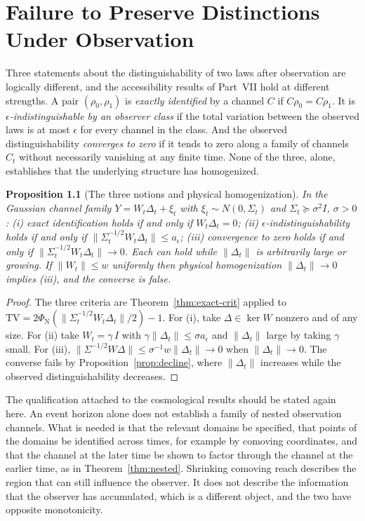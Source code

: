 \documentclass[11pt,oneside]{book}
\newtheorem{proposition}[theorem]{Proposition}
\theoremstyle{definition}
\theoremstyle{remark}
\begin{document}
\chapter{Failure to Preserve Distinctions Under Observation}\label{ch:discrim}

Three statements about the distinguishability of two laws after observation are logically different, and the accessibility results of Part~VII hold at different strengths. A pair $(\rho_0,\rho_1)$ is \emph{exactly identified} by a channel $C$ if $C\rho_0=C\rho_1$. It is \emph{$\epsilon$-indistinguishable by an observer class} if the total variation between the observed laws is at most $\epsilon$ for every channel in the class. And the observed distinguishability \emph{converges to zero} if it tends to zero along a family of channels $C_t$ without necessarily vanishing at any finite time. None of the three, alone, establishes that the underlying structure has homogenized.

\begin{proposition}[The three notions and physical homogenization]\label{prop:three-notions}
In the Gaussian channel family $Y=W_t\Delta_t+\xi_t$ with $\xi_t\sim N(0,\Sigma_t)$ and $\Sigma_t\succeq\sigma^2I$, $\sigma>0$: (i) exact identification holds if and only if $W_t\Delta_t=0$; (ii) $\epsilon$-indistinguishability holds if and only if $\|\Sigma_t^{-1/2}W_t\Delta_t\|\leq a_\epsilon$; (iii) convergence to zero holds if and only if $\|\Sigma_t^{-1/2}W_t\Delta_t\|\to0$. Each can hold while $\|\Delta_t\|$ is arbitrarily large or growing. If $\|W_t\|\leq w$ uniformly then physical homogenization $\|\Delta_t\|\to0$ implies (iii), and the converse is false.
\end{proposition}

\begin{proof}
The three criteria are Theorem~\ref{thm:exact-crit} applied to $\mathrm{TV}=2\Phi_{\mathrm N}(\|\Sigma_t^{-1/2}W_t\Delta_t\|/2)-1$. For (i), take $\Delta\in\ker W$ nonzero and of any size. For (ii) take $W_t=\gamma\,I$ with $\gamma\|\Delta_t\|\leq\sigma a_\epsilon$ and $\|\Delta_t\|$ large by taking $\gamma$ small. For (iii), $\|\Sigma^{-1/2}W\Delta\|\leq\sigma^{-1}w\|\Delta_t\|\to0$ when $\|\Delta_t\|\to0$. The converse fails by Proposition~\ref{prop:decline}, where $\|\Delta_t\|$ increases while the observed distinguishability decreases.
\end{proof}

The qualification attached to the cosmological results should be stated again here. An event horizon alone does not establish a family of nested observation channels. What is needed is that the relevant domains be specified, that points of the domains be identified across times, for example by comoving coordinates, and that the channel at the later time be shown to factor through the channel at the earlier time, as in Theorem~\ref{thm:nested}. Shrinking comoving reach describes the region that can still influence the observer. It does not describe the information that the observer has accumulated, which is a different object, and the two have opposite monotonicity.
\end{document}
